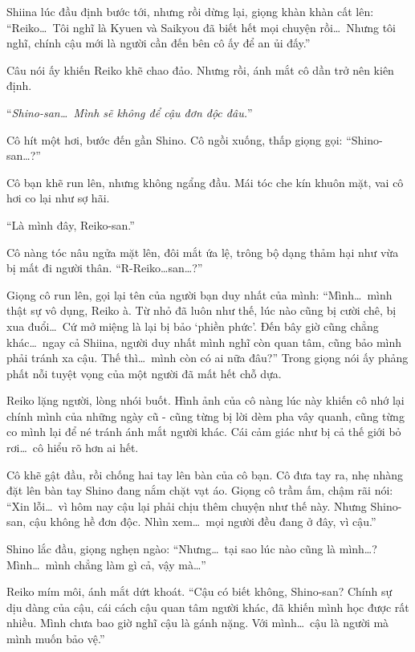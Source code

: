 \documentclass[../main.tex]{subfiles}
\begin{document}
Shiina lúc đầu định bước tới, nhưng rồi dừng lại, giọng khàn khàn cất lên: ``Reiko\dots\ Tôi nghĩ là Kyuen và Saikyou đã biết hết mọi chuyện rồi\dots\ Nhưng tôi nghĩ, chính cậu mới là người cần đến bên cô ấy để an ủi đấy.''

Câu nói ấy khiến Reiko khẽ chao đảo. Nhưng rồi, ánh mắt cô dần trở nên kiên định.

``\textit{Shino-san\dots\ Mình sẽ không để cậu đơn độc đâu.}''

Cô hít một hơi, bước đến gần Shino. Cô ngồi xuống, thấp giọng gọi: ``Shino-san\dots?''

Cô bạn khẽ run lên, nhưng không ngẩng đầu. Mái tóc che kín khuôn mặt, vai cô hơi co lại như sợ hãi.

``Là mình đây, Reiko-san.''

Cô nàng tóc nâu ngửa mặt lên, đôi mắt ứa lệ, trông bộ dạng thảm hại như vừa bị mất đi người thân. ``R-Reiko\dots san\dots?''

Giọng cô run lên, gọi lại tên của người bạn duy nhất của mình: ``Mình\dots\ mình thật sự vô dụng, Reiko à. Từ nhỏ đã luôn như thế, lúc nào cũng bị cười chê, bị xua đuổi\dots\ Cứ mở miệng là lại bị bảo `phiền phức'. Đến bây giờ cũng chẳng khác\dots\ ngay cả Shiina, người duy nhất mình nghĩ còn quan tâm, cũng bảo mình phải tránh xa cậu. Thế thì\dots\ mình còn có ai nữa đâu?'' Trong giọng nói ấy phảng phất nỗi tuyệt vọng của một người đã mất hết chỗ dựa.

Reiko lặng người, lòng nhói buốt. Hình ảnh của cô nàng lúc này khiến cô nhớ lại chính mình của những ngày cũ - cũng từng bị lời dèm pha vây quanh, cũng từng co mình lại để né tránh ánh mắt người khác. Cái cảm giác như bị cả thế giới bỏ rơi\dots\ cô hiểu rõ hơn ai hết.

Cô khẽ gật đầu, rồi chống hai tay lên bàn của cô bạn. Cô đưa tay ra, nhẹ nhàng đặt lên bàn tay Shino đang nắm chặt vạt áo. Giọng cô trầm ấm, chậm rãi nói: ``Xin lỗi\dots\ vì hôm nay cậu lại phải chịu thêm chuyện như thế này. Nhưng Shino-san, cậu không hề đơn độc. Nhìn xem\dots\ mọi người đều đang ở đây, vì cậu.''

Shino lắc đầu, giọng nghẹn ngào: ``Nhưng\dots\ tại sao lúc nào cũng là mình\dots? Mình\dots\ mình chẳng làm gì cả, vậy mà\dots''

Reiko mím môi, ánh mắt dứt khoát. ``Cậu có biết không, Shino-san? Chính sự dịu dàng của cậu, cái cách cậu quan tâm người khác, đã khiến mình học được rất nhiều. Mình chưa bao giờ nghĩ cậu là gánh nặng. Với mình\dots\ cậu là người mà mình muốn bảo vệ.''
\end{document}
